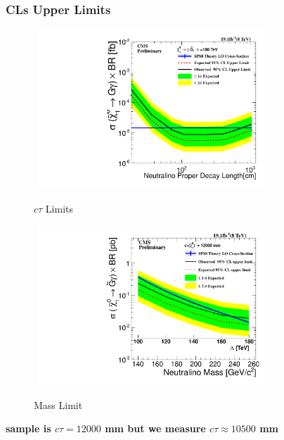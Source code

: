 \documentclass{beamer}
\begin{document}
\begin{frame}
\frametitle{\Huge CLs Upper Limits}
\begin{figure}[ht]
\begin{minipage}[b]{0.45\linewidth}
\centering
\mbox{
\includegraphics[height=6cm,width=\textwidth]{THESISPLOTS/180TeV_Neutralino_CrossSecTimesBR_Uplimit.pdf}}
\vspace{-1cm}
\caption{$c\tau$ Limits }
\label{fig:ctaulimit}
\end{minipage}
\hspace{0.1cm}
\begin{minipage}[b]{0.45\linewidth}
\centering
\mbox{
\includegraphics[height=6cm, width=\textwidth]{THESISPLOTS/Neutralino_CrosSecVsMass_Exclusion_limit_12000.pdf}}
\vspace{-1cm}
\caption{Mass Limit }
\label{fig:masslimit}
\end{minipage}
\end{figure}
\vspace{-1cm}
\alert{\textbf{sample is $c\tau= 12000$ mm but we measure $c\tau \approx 10500$ mm}}
\end{frame}
\end{document}
